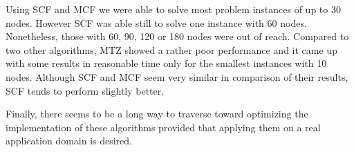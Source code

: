 Using SCF and MCF we were able to solve most problem instances of up to 30 nodes.
However SCF was able still to solve one instance with 60 nodes. Nonetheless,
those with 60, 90, 120 or 180 nodes were out of reach.
Compared to two other algorithms, MTZ showed a rather poor performance and
it came up with some results in reasonable time only for the smallest
instances with 10 nodes. Although SCF and MCF seem very similar in comparison
of their results, SCF tends to perform slightly better.

Finally, there seems to be a long way to traverse toward optimizing the
implementation of these algorithms provided that applying them on a real application domain is
desired.
